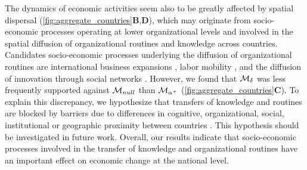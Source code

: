 The dynamics of economic activities seem also to be greatly affected by spatial dispersal (\cref{fig:aggregate_countries}\textbf{B},\textbf{D}), which may originate from socio-economic processes operating at lower organizational levels and involved in the spatial diffusion of organizational routines \citep{Hodgson2004} and knowledge \citep{RogersEverettM2003DoI,Keller2004,Bahar2014a} across countries. 
Candidates socio-economic processes underlying the diffusion of organizational routines are international business expansions \citep{Andersen1993,Zahra2000,Luo2007}, labor mobility \citep{Boschma2008}, and the diffusion of innovation through social networks \citep{RogersEverettM2003DoI,Keller2004}. However, we found that $\mathcal{M}_\delta$ was less frequently supported against $\mathcal{M}_{null}$ than $\mathcal{M}_{\alpha^+}$ (\cref{fig:aggregate_countries}\textbf{C}). To explain this discrepancy, we hypothesize that transfers of knowledge and routines are blocked by barriers due to differences in cognitive, organizational, social, institutional or geographic proximity between countries \citep{Boschma2005,Caragliu2016,Bahar2014a}. This hypothesis should be investigated in future work.
% 
Overall, our results indicate that socio-economic processes involved in the transfer of knowledge and organizational routines have an important effect on economic change at the national level.

